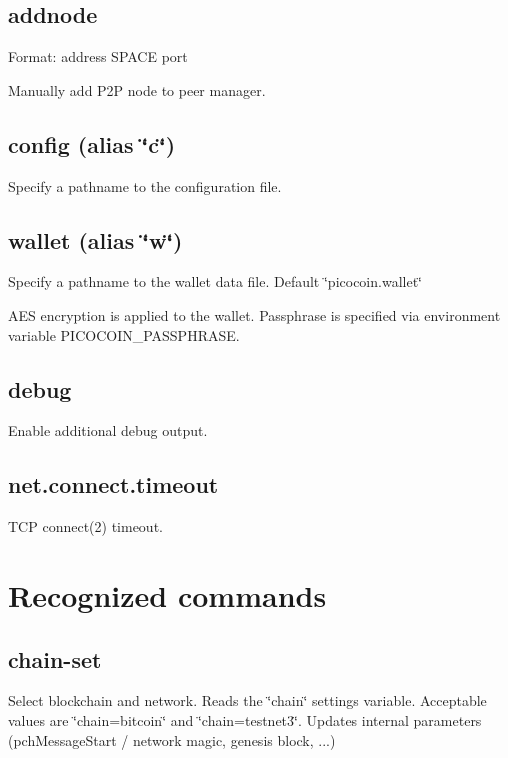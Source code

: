 \subsection*{addnode }

Format\-: address S\-P\-A\-C\-E port

Manually add P2\-P node to peer manager.

\subsection*{config (alias \char`\"{}c\char`\"{}) }

Specify a pathname to the configuration file.

\subsection*{wallet (alias \char`\"{}w\char`\"{}) }

Specify a pathname to the wallet data file. Default \char`\"{}picocoin.\-wallet\char`\"{}

A\-E\-S encryption is applied to the wallet. Passphrase is specified via environment variable P\-I\-C\-O\-C\-O\-I\-N\-\_\-\-P\-A\-S\-S\-P\-H\-R\-A\-S\-E.

\subsection*{debug }

Enable additional debug output.

\subsection*{net.\-connect.\-timeout }

T\-C\-P connect(2) timeout.

\section*{Recognized commands }

\subsection*{chain-\/set }

Select blockchain and network. Reads the \char`\"{}chain\char`\"{} settings variable. Acceptable values are \char`\"{}chain=bitcoin\char`\"{} and \char`\"{}chain=testnet3\char`\"{}. Updates internal parameters (pch\-Message\-Start / network magic, genesis block, ...)

